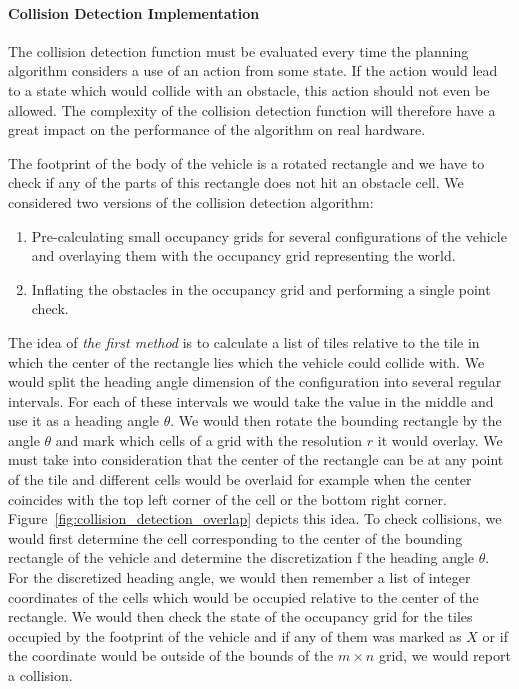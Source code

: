 \paragraph{Collision Detection Implementation}
The collision detection function must be evaluated every time the planning algorithm considers a use of an action from some state. If the action would lead to a state which would collide with an obstacle, this action should not even be allowed. The complexity of the collision detection function will therefore have a great impact on the performance of the algorithm on real hardware.

The footprint of the body of the vehicle is a rotated rectangle and we have to check if any of the parts of this rectangle does not hit an obstacle cell. We considered two versions of the collision detection algorithm:
\begin{enumerate}
	\item Pre-calculating small occupancy grids for several configurations of the vehicle and overlaying them with the occupancy grid representing the world.
	\item Inflating the obstacles in the occupancy grid and performing a single point check.
\end{enumerate}

The idea of \textit{the first method} is to calculate a list of tiles relative to the tile in which the center of the rectangle lies which the vehicle could collide with. We would split the heading angle dimension of the configuration into several regular intervals. For each of these intervals we would take the value in the middle and use it as a heading angle $\theta$. We would then rotate the bounding rectangle by the angle $\theta$ and mark which cells of a grid with the resolution $r$ it would overlay. We must take into consideration that the center of the rectangle can be at any point of the tile and different cells would be overlaid for example when the center coincides with the top left corner of the cell or the bottom right corner. Figure~\ref{fig:collision_detection_overlap} depicts this idea. To check collisions, we would first determine the cell corresponding to the center of the bounding rectangle of the vehicle and determine the discretization f the heading angle $\theta$. For the discretized heading angle, we would then remember a list of integer coordinates of the cells which would be occupied relative to the center of the rectangle. We would then check the state of the occupancy grid for the tiles occupied by the footprint of the vehicle and if any of them was marked as $X$ or if the coordinate would be outside of the bounds of the $m\times n$ grid, we would report a collision.


